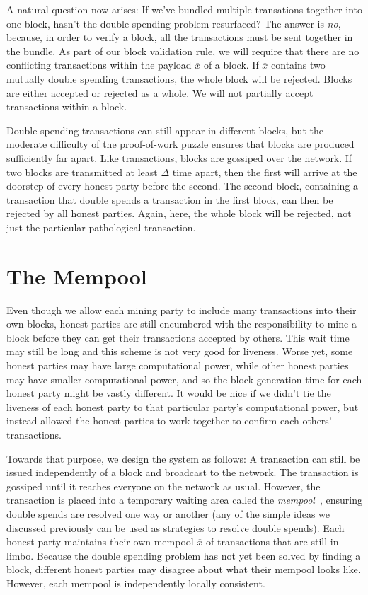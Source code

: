 A natural question now arises: If we've bundled multiple transations together into one block,
hasn't the double spending problem resurfaced? The answer is \emph{no}, because, in order to
verify a block, all the transactions must be sent together in the bundle. As part of our block
validation rule, we will require that there are no conflicting transactions within the payload
$\overline{x}$ of a block. If $\overline{x}$ contains two mutually double spending transactions,
the whole block will be rejected. Blocks are either accepted or rejected as a whole. We will not
partially accept transactions within a block.

Double spending transactions can still appear in different blocks, but the moderate difficulty
of the proof-of-work puzzle ensures that blocks are produced sufficiently far apart. Like
transactions, blocks are gossiped over the network. If two blocks are transmitted at least
$\Delta$ time apart, then the first will arrive at the doorstep of every honest party before
the second. The second block, containing a transaction that double spends a transaction in the
first block, can then be rejected by all honest parties. Again, here, the whole block will be
rejected, not just the particular pathological transaction.

\section{The Mempool}

Even though we allow each mining party to include many transactions into their own blocks,
honest parties are still encumbered with the responsibility to mine a block before they can
get their transactions accepted by others. This wait time may still be long and this scheme
is not very good for liveness. Worse yet, some honest parties may have large computational
power, while other honest parties may have smaller computational power, and so the block
generation time for each honest party might be vastly different. It would be nice if we didn't
tie the liveness of each honest party to that particular party's computational power, but
instead allowed the honest parties to work together to confirm each others' transactions.

Towards that purpose, we design the system as follows: A transaction can still be issued
independently of a block and broadcast to the network. The transaction is gossiped until
it reaches everyone on the network as usual. However, the transaction is placed into a
temporary waiting area called the \emph{mempool}~, ensuring double spends are
resolved one way or another (any of the simple ideas we discussed previously can be used as
strategies to resolve double spends).
Each honest party maintains their own mempool $\overline{x}$ of transactions that are still in limbo.
Because the double spending problem has not yet been solved by finding a block, different
honest parties may disagree about what their mempool looks like.
However, each mempool is independently locally consistent.

